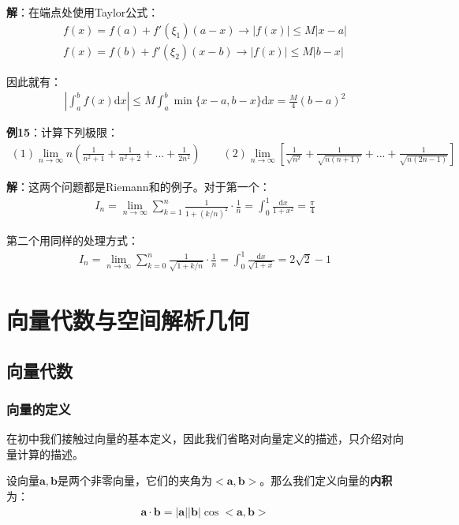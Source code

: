 \documentclass{ctexart}
\let\oldtextbf\textbf %
\renewcommand{\textbf}[1]{\textcolor{btex}{\oldtextbf{#1}}} %
\begin{document}
\textbf{解}：在端点处使用Taylor公式：
\begin{align*}
    f(x)=f(a)+f'(\xi_1)(a-x)\to |f(x)|\leq M|x-a|\\
    f(x)=f(b)+f'(\xi_2)(x-b)\to  |f(x)|\leq M|b-x|
\end{align*}

因此就有：
\begin{align*}
    |\int_a^b f(x)\mathrm{d}x|\leq M\int_a^b\min\{x-a,b-x\}\mathrm{d}x=\frac{M}{4}(b-a)^2
\end{align*}

\textbf{例15}：计算下列极限：
\begin{align*}
(1)\lim_{n\to\infty}n(\frac{1}{n^2+1}+\frac{1}{n^2+2}+...+\frac{1}{2n^2})\qquad (2)\lim_{n\to\infty}\left[\frac{1}{\sqrt{n^2}}+\frac{1}{\sqrt{n(n+1)}}+...+\frac{1}{\sqrt{n(2n-1)}}\right]
\end{align*}

\textbf{解}：这两个问题都是Riemann和的例子。对于第一个：
\begin{align*}
    I_n=\lim_{n\to\infty}\sum_{k=1}^n\frac{1}{1+(k/n)^2}\cdot\frac{1}{n}=\int_0^1\frac{\mathrm{d}x}{1+x^2}=\frac{\pi}{4}
\end{align*}

第二个用同样的处理方式：
\begin{align*}
    I_n=\lim_{n\to \infty}\sum_{k=0}^n\frac{1}{\sqrt{1+k/n}}\cdot\frac{1}{n}=\int_0^1\frac{\mathrm{d}x}{\sqrt{1+x}}=2\sqrt{2}-1
\end{align*}
\section{向量代数与空间解析几何}
\subsection{向量代数}
\subsubsection{向量的定义}
在初中我们接触过向量的基本定义，因此我们省略对向量定义的描述，只介绍对向量计算的描述。

设向量$\bm{a},\bm{b}$是两个非零向量，它们的夹角为$<\bm{a},\bm{b}>$。那么我们定义向量的\textbf{内积}为：
\begin{align*}
    \bm{a}\cdot\bm{b}=|\bm{a}||\bm{b}|\cos<\bm{a},\bm{b}>\tag{6-1}
\end{align*}
\end{document}
